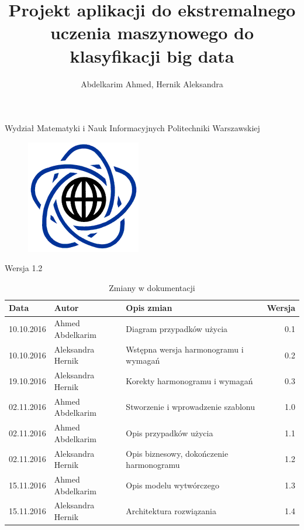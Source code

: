 \documentclass{article}
\title{Projekt aplikacji do ekstremalnego uczenia maszynowego do klasyfikacji big data}
\author{Abdelkarim Ahmed, Hernik Aleksandra}
\begin{document}
Wydział Matematyki i Nauk Informacyjnych Politechniki Warszawskiej
\begin{figure}[H]
\begin{center}
\includegraphics[scale=0.5]{MiNI.png}
\end{center}
\end{figure}
\vspace*{\fill}
\begin{center}
\begin{minipage}{.9\textwidth}
\maketitle
\begin{center}Wersja 1.2\end{center}
\end{minipage}
\end{center}
\vfill %
\clearpage
\noindent
\begin{table}[H]
\caption{Zmiany w dokumentacji}
\hspace*{-1cm}
\begin{tabular}{|l|l|l|r|}
\hline
\textbf{Data} & \textbf{Autor} & \textbf{Opis zmian} & \textbf{Wersja} \\
\hline
10.10.2016 & Ahmed Abdelkarim & Diagram przypadków użycia & 0.1 \\
10.10.2016 & Aleksandra Hernik & Wstępna wersja harmonogramu i wymagań & 0.2 \\
19.10.2016 & Aleksandra Hernik & Korekty harmonogramu i wymagań & 0.3 \\
02.11.2016 & Ahmed Abdelkarim & Stworzenie i wprowadzenie szablonu & 1.0 \\
02.11.2016 & Ahmed Abdelkarim & Opis przypadków użycia & 1.1 \\
02.11.2016 & Aleksandra Hernik & Opis biznesowy, dokończenie harmonogramu & 1.2 \\
15.11.2016 & Ahmed Abdelkarim & Opis modelu wytwórczego & 1.3 \\
15.11.2016 & Aleksandra Hernik & Architektura rozwiązania & 1.4 \\
\hline
\end{tabular}
\end{table}
\tableofcontents
\clearpage
\end{document}
